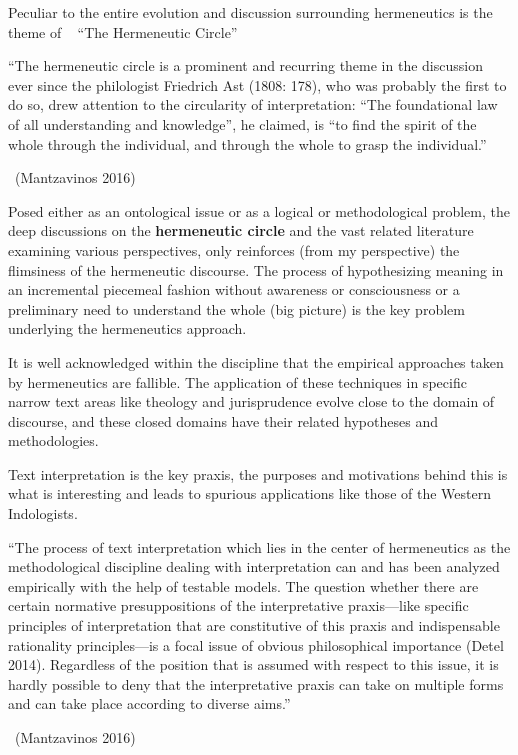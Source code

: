 Peculiar to the entire evolution and discussion surrounding hermeneutics is the theme of   “The Hermeneutic Circle”

\begin{myquote}
“The hermeneutic circle is a prominent and recurring theme in the discussion ever since the philologist Friedrich Ast (1808: 178), who was probably the first to do so, drew attention to the circularity of interpretation: “The foundational law of all understanding and knowledge”, he claimed, is “to find the spirit of the whole through the individual, and through the whole to grasp the individual.” 

~\hfill (Mantzavinos 2016)
\end{myquote}

Posed either as an ontological issue or as a logical or methodological problem, the deep discussions on the \textbf{hermeneutic circle} and the vast related literature examining various perspectives, only reinforces (from my perspective) the flimsiness of the hermeneutic discourse. The process of hypothesizing meaning in an incremental piecemeal fashion without awareness or consciousness or a preliminary need to understand the whole (big picture) is the key problem underlying the hermeneutics approach.

It is well acknowledged within the discipline that the empirical approaches taken by hermeneutics are fallible. The application of these techniques in specific narrow text areas like theology and jurisprudence evolve close to the domain of discourse, and these closed domains have their related hypotheses and methodologies.

Text interpretation is the key praxis, the purposes and motivations behind this is what is interesting and leads to spurious applications like those of the Western Indologists.

\begin{myquote}
“The process of text interpretation which lies in the center of hermeneutics as the methodological discipline dealing with interpretation can and has been analyzed empirically with the help of testable models. The question whether there are certain normative presuppositions of the interpretative praxis—like specific principles of interpretation that are constitutive of this praxis and indispensable rationality principles—is a focal issue of obvious philosophical importance (Detel 2014). Regardless of the position that is assumed with respect to this issue, it is hardly possible to deny that the interpretative praxis can take on multiple forms and can take place according to diverse aims.” 

~\hfill (Mantzavinos 2016)
\end{myquote}

